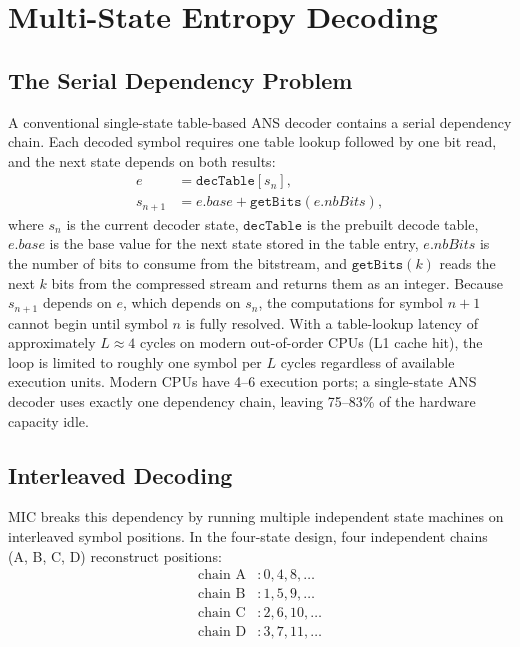 \documentclass[journal]{IEEEtran}
\begin{document}
\section{Multi-State Entropy Decoding}
\label{sec:multistate}

\subsection{The Serial Dependency Problem}

A conventional single-state table-based ANS decoder contains a serial
dependency chain. Each decoded symbol requires one table lookup followed by
one bit read, and the next state depends on both results:
\begin{equation}
\begin{aligned}
  e &= \texttt{decTable}[s_n], \\
  s_{n+1} &= e.\textit{base} + \texttt{getBits}(e.\textit{nbBits}),
\end{aligned}
\end{equation}
where $s_n$ is the current decoder state, $\texttt{decTable}$ is the
prebuilt decode table, $e.\textit{base}$ is the base value for the next
state stored in the table entry, $e.\textit{nbBits}$ is the number of bits
to consume from the bitstream, and $\texttt{getBits}(k)$ reads the next $k$
bits from the compressed stream and returns them as an integer.
Because $s_{n+1}$ depends on $e$, which depends on $s_n$, the computations
for symbol $n+1$ cannot begin until symbol $n$ is fully resolved.
With a table-lookup latency of approximately $L \approx 4$ cycles on modern
out-of-order CPUs (L1 cache hit), the loop is limited to roughly one symbol per
$L$ cycles regardless of available execution units. Modern CPUs have 4--6
execution ports; a single-state ANS decoder uses exactly one dependency chain,
leaving 75--83\% of the hardware capacity idle.

\subsection{Interleaved Decoding}

MIC breaks this dependency by running multiple independent state machines on
interleaved symbol positions. In the four-state design, four independent chains
(A, B, C, D) reconstruct positions:
\begin{align*}
  \text{chain A}&: 0, 4, 8, \ldots \\
  \text{chain B}&: 1, 5, 9, \ldots \\
  \text{chain C}&: 2, 6, 10, \ldots \\
  \text{chain D}&: 3, 7, 11, \ldots
\end{align*}
\end{document}
